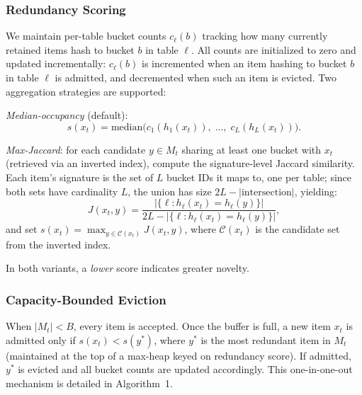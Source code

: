 \documentclass[conference]{IEEEtran}
\begin{document}
\subsubsection{Redundancy Scoring}
We maintain per-table bucket counts $c_\ell(b)$ tracking how many
currently retained items hash to bucket $b$ in table $\ell$. All counts
are initialized to zero and updated incrementally: $c_\ell(b)$ is
incremented when an item hashing to bucket $b$ in table $\ell$ is
admitted, and decremented when such an item is evicted. Two
aggregation strategies are supported:

\textit{Median-occupancy} (default):
\begin{equation}
s(x_t) = \mathrm{median}\bigl(c_1(h_1(x_t)),\; \ldots,\; c_L(h_L(x_t))\bigr).
\label{eq:median-occ}
\end{equation}

\textit{Max-Jaccard}: for each candidate $y \in M_t$ sharing at least
one bucket with $x_t$ (retrieved via an inverted index), compute the
signature-level Jaccard similarity. Each item's signature is the set of
$L$ bucket IDs it maps to, one per table; since both sets have
cardinality $L$, the union has size $2L - |\text{intersection}|$,
yielding:
\begin{equation}
J(x_t,y) = \frac{|\{\ell : h_\ell(x_t) = h_\ell(y)\}|}{2L - |\{\ell : h_\ell(x_t) = h_\ell(y)\}|},
\label{eq:jaccard}
\end{equation}
and set $s(x_t) = \max_{y \in \mathcal{C}(x_t)} J(x_t,y)$, where
$\mathcal{C}(x_t)$ is the candidate set from the inverted index.

In both variants, a \emph{lower} score indicates greater novelty.

\subsubsection{Capacity-Bounded Eviction}
When $|M_t| < B$, every item is accepted. Once the buffer is full, a
new item $x_t$ is admitted only if $s(x_t) < s(y^*)$, where $y^*$ is
the most redundant item in $M_t$ (maintained at the top of a max-heap
keyed on redundancy score). If admitted, $y^*$ is evicted and all
bucket counts are updated accordingly. This one-in-one-out mechanism
is detailed in Algorithm~1.
\end{document}
